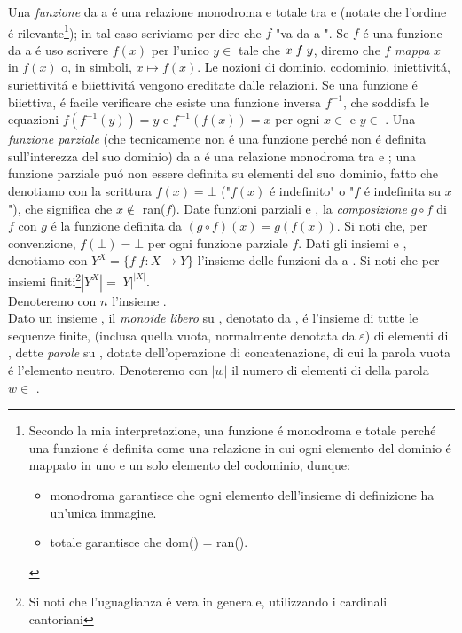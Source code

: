 Una \textit{funzione} da  a  é una relazione monodroma e totale tra  e  (notate che l'ordine é rilevante\footnote{Secondo la mia interpretazione, una funzione é monodroma e totale perché una funzione é definita come una relazione in cui ogni elemento del dominio é mappato in uno e un solo elemento del codominio, dunque:
\begin{itemize}
    \item monodroma garantisce che ogni elemento dell'insieme di definizione ha un'unica immagine.
    \item totale garantisce che dom() = ran().
\end{itemize}}); in tal caso scriviamo  per dire che $f$ "va da  a ". Se $f$ é una funzione da  a  é uso scrivere $f(x)$ per l'unico $y \in$  tale che $x \hspace{1mm} f \hspace{1mm} y$, diremo che $f$ \textit{mappa} $x$ in $f(x)$ o, in simboli, $x \mapsto f(x)$. Le nozioni di dominio, codominio, iniettivitá, suriettivitá e biiettivitá vengono ereditate dalle relazioni. Se una funzione  é biiettiva, é facile verificare che esiste una funzione inversa $f^{-1}$, che soddisfa le equazioni $f(f^{-1}(y)) = y$ e $f^{-1}(f(x)) = x$ per ogni $x \in$  e $y \in$ . Una \textit{funzione parziale} (che tecnicamente non é una funzione perché non é definita sull'interezza del suo dominio) da  a  é una relazione monodroma tra  e ; una funzione parziale puó non essere definita su elementi del suo dominio, fatto che denotiamo con la scrittura $f(x) = \bot$ ("$f(x)$ é indefinito" o "$f$ é indefinita su $x$"), che significa che $x \notin$ ran($f$). Date funzioni parziali  e , la \textit{composizione} $g \circ f$ di $f$ con $g$ é la funzione definita da $(g \circ f)(x) = g(f(x))$. Si noti che, per convenzione, $f(\bot) = \bot$ per ogni funzione parziale $f$. Dati gli insiemi  e , denotiamo con $Y^X = \{f | f : X \rightarrow Y\}$ l'insieme delle funzioni da  a . Si noti che per insiemi finiti\footnote{Si noti che l'uguaglianza é vera in generale, utilizzando i cardinali cantoriani}$|Y^X| = |Y|^{|X|}$.\\
Denoteremo con $n$ l'insieme .\\
Dato un insieme , il \textit{monoide libero} su , denotato da , é l'insieme di tutte le sequenze finite, (inclusa quella vuota, normalmente denotata da $\varepsilon$) di elementi di , dette \textit{parole} su , dotate dell'operazione di concatenazione, di cui la parola vuota é l'elemento neutro. Denoteremo con $|w|$ il numero di elementi di  della parola $w \in$ .
